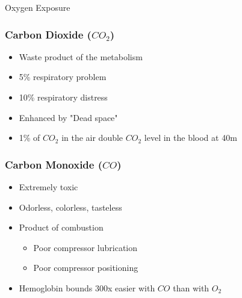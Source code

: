\documentclass[aspectratio=1610,english,12pt]{beamer}
\begin{document}
\begin{frame}{Oxygen Exposure}
\end{frame}

\subsubsection{Carbon Dioxide ($CO_2$)}
\begin{frame}{\insertsubsubsection}
	\begin{itemize}
		\item Waste product of the metabolism
		\item 5\% respiratory problem
		\item 10\% respiratory distress
		\item Enhanced by "Dead space"
		\item 1\% of $CO_2$ in the air double $CO_2$ level in the blood at 40m
	\end{itemize}
\end{frame}

\begin{frame}{\insertsubsubsection}
\end{frame}

\subsubsection{Carbon Monoxide ($CO$)}
\begin{frame}{\insertsubsubsection}
	\begin{itemize}
		\item Extremely toxic
		\item Odorless, colorless, tasteless
		\item Product of combustion
		\begin{itemize}
			\item Poor compressor lubrication
			\item Poor compressor positioning
		\end{itemize}
		\item Hemoglobin bounds 300x easier with $CO$ than with $O_2$
	\end{itemize}
\end{frame}

\end{document}
